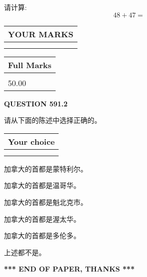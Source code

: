 \documentclass{ctexart}
\begin{document}
  
 
请计算:
\begin{equation}
48 +  %
47 = \nonumber
\end{equation}
 

 

 
  
\vspace{0.2in}
  
\noindent\begin{tabular}{|l|}
\hline
 YOUR MARKS  \\
\hline
 \\ 
 \\ 
\hline
\end{tabular}
\hspace{0.05in} \begin{tabular}{|l|}
\hline
 Full Marks  \\
\hline
 \\ 
50.00 \\
\hline
\end{tabular}
{\textbf{\Large{QUESTION
591.2 
}}}
  
  
请从下面的陈述中选择正确的。
  
  
\noindent\hspace{3.0in} \begin{tabular}{|l|}
\hline
Your choice \\
\hline
 \\ 
 \\ 
\hline
\end{tabular}
  
  
 
 
加拿大的首都是蒙特利尔。
 
 
加拿大的首都是温哥华。
 
 
加拿大的首都是魁北克市。
 
 
加拿大的首都是渥太华。
 
 
加拿大的首都是多伦多。
 
 
 上述都不是。
 
 
   
   
 \vspace{0.2in}
 
   
   
   
   
\vspace{1.0in} 
{\textbf{\large{ *** END OF PAPER, THANKS *** }}} 
   
\end{document}
